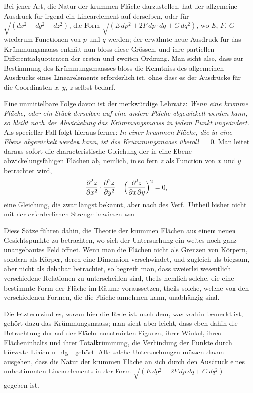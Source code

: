 \documentclass[fontsize=10pt,paper=a5,pagesize,headings=small,headinclude=true,footinclude=true]{scrbook}
\begin{document}
Bei jener Art, die Natur der krummen Fläche darzustellen, hat der allgemeine Ausdruck für irgend ein Linearelement auf derselben, oder für $\sqrt{(dx^2+dy^2+dz^2)}$, die Form $\sqrt{(E\,dp^2+2F\,dp\cdot dq+G\,dq^2)}$, wo $E$, $F$, $G$ wiederum Functionen von $p$ und $q$ werden; der erwähnte neue Ausdruck für das Krümmungsmaass enthält nun bloss diese Grössen, und ihre partiellen Differentialquotienten der ersten und zweiten Ordnung. Man sieht also, dass zur Bestimmung des Krümmungsmaasses bloss die Kenntniss des allgemeinen Ausdrucks eines Linearelements erforderlich ist, ohne dass es der Ausdrücke für die Coordinaten $x$, $y$, $z$ selbst bedarf.

Eine unmittelbare Folge davon ist der merkwürdige Lehrsatz: \textit{Wenn eine krumme Fläche, oder ein Stück derselben auf eine andere Fläche abgewickelt werden kann, so bleibt nach der Abwickelung das Krümmungsmaass in jedem Punkt ungeändert.} Als specieller Fall folgt hieraus ferner: \textit{In einer krummen Fläche, die in eine Ebene abgewickelt werden kann, ist das Krümmungsmaass überall $=0$.} Man leitet daraus sofort die characteristische Gleichung der in eine Ebene abwickelungsfähigen Flächen ab, nemlich, in so fern $z$ als Function von $x$ und $y$ betrachtet wird,
\[
\frac{\partial^2 z}{\partial x^2}\cdot\frac{\partial^2 z}{\partial y^2}-\Bigl(\frac{\partial^2 z}{\partial x\,\partial y}\Bigr)^2=0,
\]
eine Gleichung, die zwar längst bekannt, aber nach des Verf.~Urtheil bisher nicht mit der erforderlichen Strenge bewiesen war.

Diese Sätze führen dahin, die Theorie der krummen Flächen aus einem neuen Gesichtspunkte zu betrachten, wo sich der Untersuchung ein weites noch ganz unangebautes Feld öffnet. Wenn man die Flächen nicht als Grenzen von Körpern, sondern als Körper, deren eine Dimension verschwindet, und zugleich als biegsam, aber nicht als dehnbar betrachtet, so begreift man, dass zweierlei wesentlich verschiedene Relationen zu unterscheiden sind, theils nemlich solche, die eine bestimmte Form der Fläche im Räume voraussetzen, theils solche, welche von den verschiedenen Formen, die die Fläche annehmen kann, unabhängig sind.

Die letztern sind es, wovon hier die Rede ist: nach dem, was vorhin bemerkt ist, gehört dazu das Krümmungsmaass; man sieht aber leicht, dass eben dahin die Betrachtung der auf der Fläche construirten Figuren, ihrer Winkel, ihres Flächeninhalts und ihrer Totalkrümmung, die Verbindung der Punkte durch kürzeste Linien u.~dgl.~gehört. Alle solche Untersuchungen müssen davon ausgehen, dass die Natur der krummen Fläche an sich durch den Ausdruck eines unbestimmten Linearelements in der Form $\sqrt{(E\,dp^2+2F\,dp\,dq+G\,dq^2)}$ gegeben ist.
\end{document}

